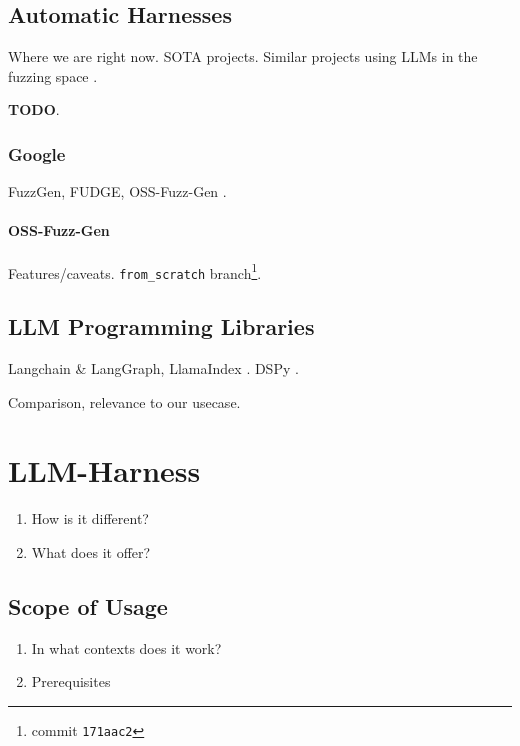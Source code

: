 \documentclass[
  a4paper,
  DIV=11,
  numbers=noendperiod]{scrreprt}
\providecommand{\tightlist}{%
  \setlength{\itemsep}{0pt}\setlength{\parskip}{0pt}}
\begin{document}
\section{Automatic Harnesses}\label{automatic-harnesses}

Where we are right now. SOTA projects. Similar projects using LLMs in
the fuzzing space \autocite{fuzzgpt,titanfuzz,iris}.

\textbf{TODO}.

\subsection{Google}\label{google}

FuzzGen, FUDGE, OSS-Fuzz-Gen
\autocite{fuzzgen,fudge,oss-fuzz,oss-fuzz-gen}.

\subsubsection{OSS-Fuzz-Gen}\label{oss-fuzz-gen}

Features/caveats. \texttt{from\_scratch} branch\footnote{commit
  \texttt{171aac2}}.

\section{LLM Programming Libraries}\label{llm-programming-libraries}

Langchain \& LangGraph, LlamaIndex
\autocite{langchain,langgraph,llamaindex}. DSPy \autocite{dspy}.

Comparison, relevance to our usecase.


\chapter{LLM-Harness}\label{llm-harness}

\begin{enumerate}
\def\labelenumi{\arabic{enumi}.}
\tightlist
\item
  How is it different?
\item
  What does it offer?
\end{enumerate}

\section{Scope of Usage}\label{scope-of-usage}

\begin{enumerate}
\def\labelenumi{\arabic{enumi}.}
\tightlist
\item
  In what contexts does it work?
\item
  Prerequisites
\end{enumerate}
\end{document}
